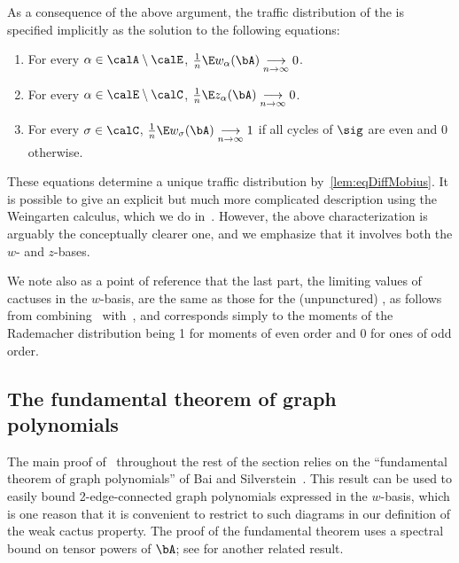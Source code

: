 As a consequence of the above argument, the traffic distribution of the \rrom is specified implicitly as the solution to the following equations:
\begin{enumerate}
    \item For every $\alpha\in\calA\setminus \calE$, $\frac 1n \E w_\alpha(\bA) \underset{n\to\infty}{\longrightarrow}0$.
    \item For every $\alpha\in \calE\setminus \calC$, $\frac 1n \E z_\alpha(\bA) \underset{n\to\infty}{\longrightarrow}0$.
    \item For every $\sigma\in\calC$, $\frac 1n \E w_\sigma(\bA)\underset{n\to\infty}{\longrightarrow} 1$ if all cycles of $\sig$ are even and 0 otherwise.
\end{enumerate}
These equations determine a unique traffic distribution by~\cref{lem:eqDiffMobius}.
It is possible to give an explicit but much more complicated description using the Weingarten calculus, which we do in~.
However, the above characterization is arguably the conceptually clearer one, and we emphasize that it involves both the $w$- and $z$-bases.

We note also as a point of reference that the last part, the limiting values of cactuses in the $w$-basis, are the same as those for the (unpunctured) \rom, as follows from combining~ with~, and corresponds simply to the moments of the Rademacher distribution being 1 for moments of even order and 0 for ones of odd order.

\subsection{The fundamental theorem of graph polynomials}

The main proof of~ throughout the rest of the section relies on the
``fundamental theorem of graph polynomials'' of Bai and Silverstein~\cite{bai2010spectral}.
This result can be used to easily bound
2-edge-connected graph polynomials 
expressed in the $w$-basis, which is one reason that it is convenient to restrict to such diagrams in our definition of the weak cactus property.
The proof of the fundamental theorem uses a spectral bound on tensor powers of $\bA$; see \cite{mingo2012sharp} for another related result.

